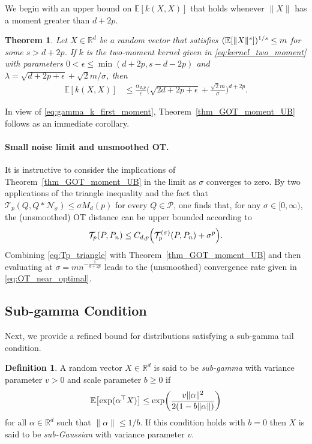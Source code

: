 \documentclass{article}
\newtheorem{theorem}{Theorem}
\theoremstyle{definition}
\newtheorem{definition}{Definition}
\newcommand{\reals}{\mathbb{R}}
\newcommand{\bEx}{\ensuremath{\mathbb{E}}}
\newcommand{\ex}[1]{\ensuremath{\mathbb{E}\left[ #1\right]}}
\newcommand{\normal}{\mathcal{N}}
\newcommand{\cP}{\mathcal{P}}
\newcommand{\cT}{\mathcal{T}}
\newcommand{\eps}{\epsilon}
\let\originalleft\left
\let\originalright\right
\renewcommand{\left}{\mathopen{}\mathclose\bgroup\originalleft}
\renewcommand{\right}{\aftergroup\egroup\originalright}
\begin{document}
We begin with an upper bound on $\bEx[k(X, X)]$ that holds whenever $\|X\|$ has a moment greater than $d + 2p$. 

\begin{theorem}\label{thm:HOmoment}
Let $X \in \reals^d$  be a random vector that satisfies $(\ex{ \|X\|^s})^{1/s}  \le m$  for some $s > d + 2p$. If $k$ is the two-moment kernel given in \eqref{eq:kernel_two_moment} with parameters $0 < \eps \le  \min(d +2p, s - d - 2p)$ and  $\lambda =  \sqrt{d+2p + \eps}    +   \sqrt{2} m/ \sigma $,  then
\begin{align*}
 \bEx[ k(X,X)] &\le \frac{\alpha_{d,p}}{\eps} \Big(\sqrt{2d+2p + \eps}    +   \frac{\sqrt{2} m}{\sigma} \Big)^{d + 2p}  .
 \end{align*}
\end{theorem}

In view of \eqref{eq:gamma_k_first_moment}, Theorem~\ref{thm_GOT_moment_UB} follows as an immediate corollary.


\paragraph{Small noise limit and unsmoothed OT.} It is instructive to consider the implications of Theorem~\ref{thm_GOT_moment_UB} in the limit  as $\sigma$ converges to zero. By two applications of the triangle inequality and the fact that $\cT_p(Q, Q\ast\normal_\sigma) \le \sigma M_{d}(p)$ for every $Q \in \cP$,  one finds that, for any $\sigma \in [0, \infty)$,  the (unsmoothed) OT distance can be upper bounded according to
\begin{align}
    \cT_p(P,P_n) \le C_{d,p} \left( \cT^{(\sigma)}_p(P,P_n)  + \sigma^p \right). \label{eq:Tp_triangle}
\end{align} 
Combining  \eqref{eq:Tp_triangle} with Theorem~\ref{thm_GOT_moment_UB} and then evaluating  at $\sigma =  m  n^{-\frac{1}{d + 2p}}$ leads to the (unsmoothed) convergence rate given in \eqref{eq:OT_near_optimal}. 


\subsection{Sub-gamma Condition} 
Next, we provide a refined bound for distributions satisfying a sub-gamma tail condition. 
\begin{definition}
 A random vector $X \in \reals^d$ is said to be \emph{sub-gamma} with variance parameter $v > 0$ and scale parameter $b \ge 0$ if 
\begin{align}
\ex{ \exp( \alpha^\top X)} \le \exp\left( \frac{ v \| \alpha\|^2 }{2 ( 1- b \|\alpha\|)} \right) 
\end{align}
for all $\alpha \in \reals^d$ such that $\|\alpha\| \le 1/b$. If this condition holds with $b =0$ then $X$ is said to be \emph{sub-Gaussian} with variance parameter $v$. 
\end{definition}
\end{document}
